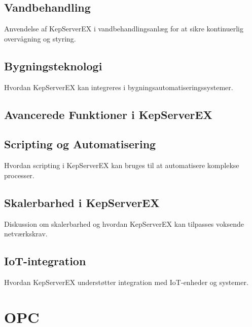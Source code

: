 \subsection{Vandbehandling}
Anvendelse af KepServerEX i vandbehandlingsanlæg for at sikre kontinuerlig overvågning og styring.

\subsection{Bygningsteknologi}
Hvordan KepServerEX kan integreres i bygningsautomatiseringssystemer.

\subsection{Avancerede Funktioner i KepServerEX}
\subsection{Scripting og Automatisering}
Hvordan scripting i KepServerEX kan bruges til at automatisere komplekse processer.

\subsection{Skalerbarhed i KepServerEX}
Diskussion om skalerbarhed og hvordan KepServerEX kan tilpasses voksende netværkskrav.

\subsection{IoT-integration}
Hvordan KepServerEX understøtter integration med IoT-enheder og systemer.

\section{OPC}
\clearpage